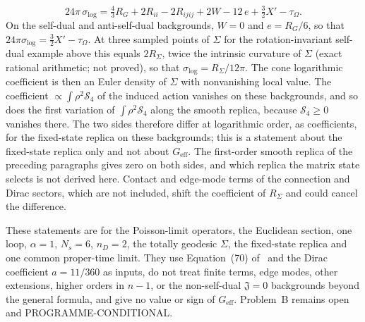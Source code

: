 \[
  24\pi\,\sigma_{\log}=\tfrac43R_G+2R_{ii}-2R_{ijij}+2W-12\,e+\tfrac32X'-\tau_\Omega .
\]
On the self-dual and anti-self-dual backgrounds, \(W=0\) and \(e=R_G/6\), so that \(24\pi\sigma_{\log}=\tfrac32X'-\tau_\Omega\). At three sampled points of \(\Sigma\) for the rotation-invariant self-dual example above this equals \(2R_\Sigma\), twice the intrinsic curvature of \(\Sigma\) (exact rational arithmetic; not proved), so that \(\sigma_{\log}=R_\Sigma/12\pi\). The cone logarithmic coefficient is then an Euler density of \(\Sigma\) with nonvanishing local value. The coefficient \(\propto\int\rho^2\mathcal S_4\) of the induced action vanishes on these backgrounds, and so does the first variation of \(\int\rho^2\mathcal S_4\) along the smooth replica, because \(\mathcal S_4\ge0\) vanishes there. The two sides therefore differ at logarithmic order, as coefficients, for the fixed-state replica on these backgrounds; this is a statement about the fixed-state replica only and not about \(G_{\mathrm{eff}}\). The first-order smooth replica of the preceding paragraphs gives zero on both sides, and which replica the matrix state selects is not derived here. Contact and edge-mode terms of the connection and Dirac sectors, which are not included, shift the coefficient of \(R_\Sigma\) and could cancel the difference.

These statements are for the Poisson-limit operators, the Euclidean section, one loop, \(\alpha=1\), \(N_s=6\), \(n_D=2\), the totally geodesic \(\Sigma\), the fixed-state replica and one common proper-time limit. They use Equation~(70) of~\cite{Solodukhin2011} and the Dirac coefficient \(a=11/360\) as inputs, do not treat finite terms, edge modes, other extensions, higher orders in \(n-1\), or the non-self-dual \(\mathfrak J=0\) backgrounds beyond the general formula, and give no value or sign of \(G_{\mathrm{eff}}\). Problem~B remains open and PROGRAMME-CONDITIONAL.

